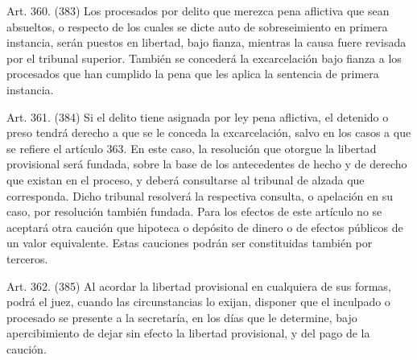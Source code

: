     Art. 360. (383) Los procesados por delito que merezca pena aflictiva que sean absueltos, o respecto de los cuales se dicte auto de sobreseimiento en primera instancia, serán puestos en libertad, bajo fianza, mientras la causa fuere revisada por el tribunal superior.
    También se concederá la excarcelación bajo fianza a los procesados que han cumplido la pena que les aplica la sentencia de primera instancia.

    Art. 361. (384) Si el delito tiene asignada por ley pena aflictiva, el detenido o preso tendrá derecho a que se le conceda la excarcelación, salvo en los casos a que se refiere el artículo 363.
    En este caso, la resolución que otorgue la libertad provisional será fundada, sobre la base de los antecedentes de hecho y de derecho que existan en el proceso, y deberá consultarse al tribunal de alzada que corresponda. Dicho tribunal resolverá la respectiva consulta, o apelación en su caso, por resolución también fundada.
    Para los efectos de este artículo no se aceptará otra caución que hipoteca o depósito de dinero o de efectos públicos de un valor equivalente. Estas cauciones podrán ser constituidas también por terceros.

    Art. 362. (385) Al acordar la libertad provisional en cualquiera de sus formas, podrá el juez, cuando las circunstancias lo exijan, disponer que el inculpado o procesado se presente a la secretaría, en los días que le determine, bajo apercibimiento de dejar sin efecto la libertad provisional, y del pago de la caución.





